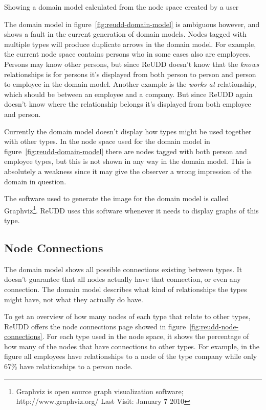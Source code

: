 \documentclass[a4paper]{report}
\begin{document}
	{Showing a domain model calculated from the node space created by a user}

The domain model in figure~\ref{fig:reudd-domain-model} is ambiguous however, and shows a fault in the current generation of domain models. Nodes tagged with multiple types will produce duplicate arrows in the domain model. For example, the current node space contains persons who in some cases also are employees. Persons may know other persons, but since ReUDD doesn't know that the \emph{knows} relationships is for persons it's displayed from both person to person and person to employee in the domain model. Another example is the \emph{works at} relationship, which should be between an employee and a company. But since ReUDD again doesn't know where the relationship belongs it's displayed from both employee and person.

Currently the domain model doesn't display how types might be used together with other types. In the node space used for the domain model in figure~\ref{fig:reudd-domain-model} there are nodes tagged with both person and employee types, but this is not shown in any way in the domain model. This is absolutely a weakness since it may give the observer a wrong impression of the domain in question.

The software used to generate the image for the domain model is called Graphviz\footnote{Graphviz is open source graph visualization software; http://www.graphviz.org/ Last Visit: January 7 2010}. ReUDD uses this software whenever it needs to display graphs of this type.

\subsection{Node Connections}
The domain model shows all possible connections existing between types. It doesn't guarantee that all nodes actually have that connection, or even any connection. The domain model describes what kind of relationships the types might have, not what they actually do have.

To get an overview of how many nodes of each type that relate to other types, ReUDD offers the node connections page showed in figure~\ref{fig:reudd-node-connections}. For each type used in the node space, it shows the percentage of how many of the nodes that have connections to other types. For example, in the figure all employees have relationships to a node of the type company while only 67\% have relationships to a person node.
\end{document}
